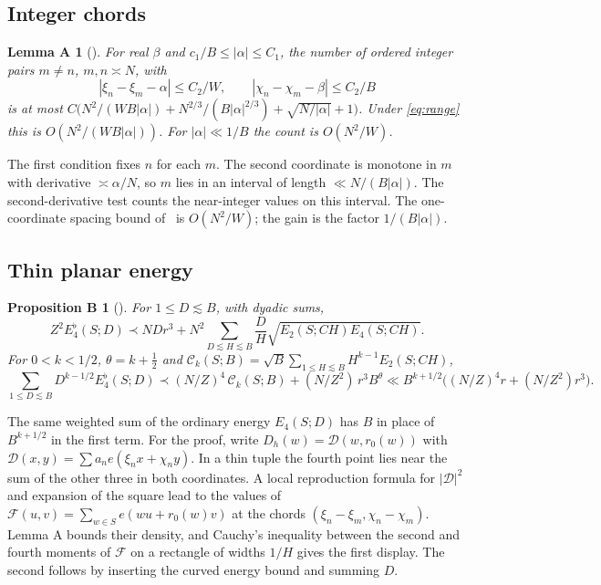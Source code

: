 \documentclass[10pt]{amsart}
\newtheorem*{chordlemma}{Lemma A}
\newtheorem*{energyprop}{Proposition B}
\begin{document}
\subsection*{Integer chords}
\begin{chordlemma}[{\cite[Lemma~\ref*{p-lem:chordreproof}]{Thin}}]
For real $\beta$ and $c_1/B\le|\alpha|\le C_1$, the number of
ordered integer pairs $m\ne n$, $m,n\asymp N$, with
\[
 |\xi_n-\xi_m-\alpha|\le C_2/W,\qquad
 |\chi_n-\chi_m-\beta|\le C_2/B
\]
is at most
$C\bigl(N^2/(WB|\alpha|)+N^{2/3}/(B|\alpha|^{2/3})+\sqrt{N/|\alpha|}+1\bigr)$.
Under \eqref{eq:range} this is $O(N^2/(WB|\alpha|))$. For
$|\alpha|\ll1/B$ the count is $O(N^2/W)$.
\end{chordlemma}
The first condition fixes $n$ for each $m$. The second coordinate is
monotone in $m$ with derivative $\asymp\alpha/N$, so $m$ lies in an interval
of length $\ll N/(B|\alpha|)$. The second-derivative test counts the
near-integer values on this interval. The one-coordinate spacing bound
of~\cite{dFP} is $O(N^2/W)$; the gain is the factor $1/(B|\alpha|)$.

\subsection*{Thin planar energy}
\begin{energyprop}[{\cite[Propositions~\ref*{p-prop:planarreproof}
and~\ref*{p-prop:pairprofile}]{Thin}}]
For $1\le D\lesssim B$, with dyadic sums,
\[
 Z^2E_4^\flat(S;D)\prec NDr^3+
 N^2\sum_{D\lesssim H\lesssim B}\frac DH\sqrt{E_2(S;CH)E_4(S;CH)}.
\]
For $0<k<1/2$, $\theta=k+\tfrac12$ and
$\mathcal C_k(S;B)=\sqrt B\sum_{1\le H\lesssim B}H^{k-1}E_2(S;CH)$,
\[
 \sum_{1\le D\lesssim B}D^{k-1/2}E_4^\flat(S;D)
 \prec(N/Z)^4\,\mathcal C_k(S;B)+(N/Z^2)\,r^3B^\theta
 \ll B^{k+1/2}\bigl((N/Z)^4r+(N/Z^2)r^3\bigr).
\]
\end{energyprop}
The same weighted sum of the ordinary energy $E_4(S;D)$ has $B$ in place
of $B^{k+1/2}$ in the first term. For the proof, write
$D_h(w)=\mathcal D(w,r_0(w))$ with
$\mathcal D(x,y)=\sum a_ne(\xi_nx+\chi_ny)$. In a thin tuple the fourth
point lies near the sum of the other three in both coordinates. A local
reproduction formula for $|\mathcal D|^2$ and expansion of the square
lead to the values of
$\mathcal F(u,v)=\sum_{w\in S}e(wu+r_0(w)v)$ at the chords
$(\xi_n-\xi_m,\chi_n-\chi_m)$. Lemma A bounds their density, and
Cauchy's inequality between the second and fourth moments of
$\mathcal F$ on a rectangle of widths $1/H$ gives the first display. The
second follows by inserting the curved energy bound and summing $D$.
\end{document}
